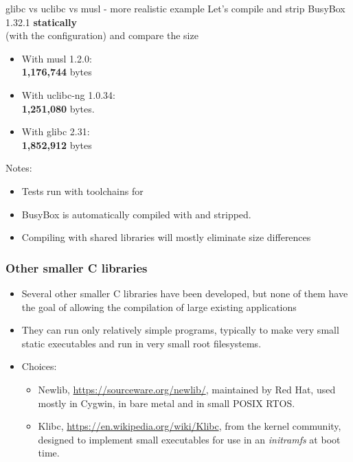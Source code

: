 \begin{frame}{glibc vs uclibc vs musl - more realistic example}
  Let's compile and strip BusyBox 1.32.1 {\bf statically}\\
  (with the  configuration) and compare the size
  \begin{itemize}
    \item With musl 1.2.0:\\
          {\bf 1,176,744} bytes
    \item With uclibc-ng 1.0.34:\\
          {\bf 1,251,080} bytes.\\
    \item With glibc 2.31:\\
          {\bf 1,852,912} bytes
  \end{itemize}
  Notes:
  \begin{itemize}
    \item Tests run with  toolchains for 
    \item BusyBox is automatically compiled with  and stripped.
    \item Compiling with shared libraries will mostly eliminate size differences
  \end{itemize}
\end{frame}

\begin{frame}
  \frametitle{Other smaller C libraries}
  \begin{itemize}
  \item Several other smaller C libraries have been developed, but
    none of them have the goal of allowing the compilation of large
    existing applications
  \item They can run only relatively simple programs,
        typically to make very small static executables and run
        in very small root filesystems.
  \item Choices:
    \begin{itemize}
    \item Newlib, \url{https://sourceware.org/newlib/},
          maintained by Red Hat, used mostly in Cygwin, in bare metal
          and in small POSIX RTOS.
    \item Klibc, \url{https://en.wikipedia.org/wiki/Klibc},
          from the kernel community, designed to implement small executables
          for use in an {\em initramfs} at boot time.
    \end{itemize}
  \end{itemize}
\end{frame}

